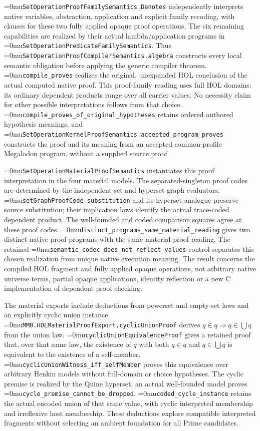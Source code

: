 \documentclass[11pt]{article}
\newcommand{\leanname}[1]{\textup{\Urlmuskip=0mu\relax\nolinkurl{#1}}}
\theoremstyle{definition}
\theoremstyle{remark}
\begin{document}
\leanname{SetOperationProofFamilySemantics.Denotes} independently interprets
native variables, abstraction, application and explicit family recoding, with
clauses for these two fully applied opaque proof operations. The six remaining
capabilities are realized by their actual lambda/application programs in
\leanname{SetOperationPredicateFamilySemantics}. Thus
\leanname{SetOperationProofCompilerSemantics.algebra} constructs every local
semantic obligation before applying the generic compiler theorem.
\leanname{compile_proves} realizes the original, unexpanded HOL conclusion
of the actual computed native proof. This proof-family reading uses full HOL
domains: its ordinary dependent products range over all carrier values.
No necessity claim for other possible interpretations follows from that choice.
\leanname{compile_proves_of_original_hypotheses} retains ordered authored
hypothesis meanings, and \leanname{SetOperationKernelProofSemantics.accepted_program_proves}
constructs the proof and its meaning from an accepted common-profile Megalodon
program, without a supplied source proof.

\leanname{SetOperationMaterialProofSemantics} instantiates this proof
interpretation in the four material models. The separated-singleton proof codes
are determined by the independent set and hyperset graph evaluators.
\leanname{setGraphProofCode_substitution} and its hyperset analogue preserve
source substitution; their implication laws identify the actual trace-coded
dependent product. The well-founded and coded comparison squares agree at
these proof codes. \leanname{distinct_programs_same_material_reading} gives
two distinct native proof programs with the same material proof reading.
The retained \leanname{semantic_codec_does_not_reflect_values} control
separates this chosen realization from unique native execution meaning.
The result concerns the compiled HOL fragment and fully applied opaque
operations, not arbitrary native universe terms, partial opaque applications,
identity reflection or a new C implementation of dependent proof checking.

The material exports include deductions from powerset and empty-set laws and
an explicitly cyclic union instance.
\leanname{MM0.HOLMaterialProofExport.cyclicUnionProof} derives
$q\in q\Rightarrow q\in\bigcup q$ from the union law.
\leanname{cyclicUnionEquivalenceProof} gives a retained proof that, over
that same law, the existence of $q$ with both $q\in q$ and
$q\in\bigcup q$ is equivalent to the existence of a self-member.
\leanname{cyclicUnionWitness_iff_selfMember} proves this equivalence over
arbitrary Henkin models without full-domain or choice hypotheses.
The cyclic premise is realized by the Quine hyperset; an actual well-founded
model proves \leanname{cycle_premise_cannot_be_dropped}.
\leanname{coded_cycle_instance} retains the actual encoded union of that
same value, with cyclic interpreted membership and irreflexive host membership.
These deductions explore compatible interpreted fragments without selecting
an ambient foundation for all Prime candidates.
\end{document}
